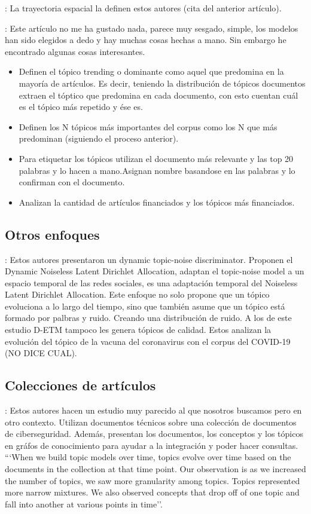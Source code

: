 \documentclass[a4paper,10pt]{article}
\begin{document}
\cite{Lee2011}: La trayectoria espacial la definen estos autores (cita del anterior artículo).

\cite{Alazba2022}: Este artículo no me ha gustado nada, parece muy sesgado, simple, los modelos han sido elegidos a dedo y hay muchas cosas hechas a mano. Sin embargo he encontrado algunas cosas interesantes.
\begin{itemize}
 \item Definen el tópico trending o dominante como aquel que predomina en la mayoría de artículos. Es decir, teniendo la distribución de tópicos documentos extraen el tóptico que predomina en cada documento, con esto cuentan cuál es el tópico más repetido y ése es.
 \item Definen los N tópicos más importantes del corpus como los N que más predominan (siguiendo el proceso anterior).
 \item Para etiquetar los tópicos utilizan el documento más relevante y las top 20 palabras y lo hacen a mano.Asignan nombre basandose en las palabras y lo confirman con el documento.
 \item Analizan la cantidad de artículos financiados y los tópicos más financiados.
\end{itemize}



\subsection{Otros enfoques}
\cite{Churchill2022}: Estos autores presentaron un dynamic topic-noise discriminator. Proponen el Dynamic Noiseless Latent Dirichlet Allocation, adaptan el topic-noise model a un espacio temporal de las redes sociales, es una adaptación temporal del Noiseless Latent Dirichlet Allocation. Este enfoque no solo propone que un tópico evoluciona a lo largo del tiempo, sino que también asume que un tópico está formado por palbras y ruido. Creando una distribución de ruido. A los de este estudio D-ETM tampoco les genera tópicos de calidad. Estos analizan la evolución del tópico de la vacuna del coronavirus con el corpus del COVID-19 (NO DICE CUAL).


\subsection{Colecciones de artículos}
\cite{Sleeman2021}: Estos autores hacen un estudio muy parecido al que nosotros buscamos pero en otro contexto. Utilizan documentos técnicos sobre una colección de documentos de ciberseguridad. Además, presentan los documentos, los conceptos y los tópicos en gráfos de conocimiento para ayudar a la integración y poder hacer consultas.  ```When we build topic models over time, topics evolve over time based on the documents in the collection at that time point. Our observation is as we increased the number of topics, we saw more granularity among topics. Topics represented more narrow mixtures. We also observed concepts that drop off of one topic and fall into another at various points in time''.
\end{document}
